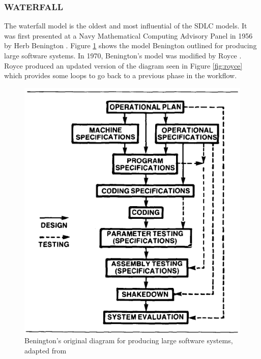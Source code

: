 \documentclass[SDSUThesis.tex]{subfiles}
\begin{document}
    
    \subsubsection{WATERFALL}
        The waterfall model is the oldest and most influential of the SDLC models. 
        It was first presented at a Navy Mathematical Computing Advisory Panel in 1956
        by Herb Benington \cite{Benington1987}. Figure \ref{fig:benington} shows
        the model Benington outlined for producing large software systems.  
        In 1970, Benington's model was modified by Royce \cite{Royce1987}.  Royce
        produced an updated version of the diagram seen in Figure \ref{fig:royce}
        which provides some loops to go back to a previous phase in the workflow.
    
        \begin{figure}
            \centering
            \includegraphics[scale=.5]{images/benington_waterfall.PNG}
            \caption[Benington's original diagram for producing large software systems]
                    {Benington's original diagram for producing large software 
                        systems, adapted from \cite{Benington1987}}
            \label{fig:benington}
        \end{figure}%
\end{document}
